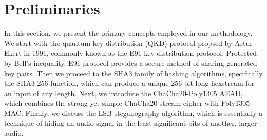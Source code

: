 \documentclass{article}
\begin{document}
\section{Preliminaries}
\label{sec:preliminaries}
In this section, we present the primary concepts employed in our methodology. We start with the quantum key distribution (QKD) protocol propsed by Artur Ekert in 1991, commonly known as the E91 key distribution protocol. Protected by Bell's inequality, E91 protocol provides a secure method of sharing generated key pairs. Then we proceed to the SHA3 family of hashing algorithms, specifically the SHA3-256 function, which can produce a unique 256-bit long hexstream for an input of any length. Next, we introduce the ChaCha20-Poly1305 AEAD, which combines the strong yet simple ChaCha20 stream cipher with Poly1305 MAC. Finally, we discuss the LSB steganography algorithm, which is essentially a technique of hiding an audio signal in the least significant bits of another, larger audio.
\end{document}

